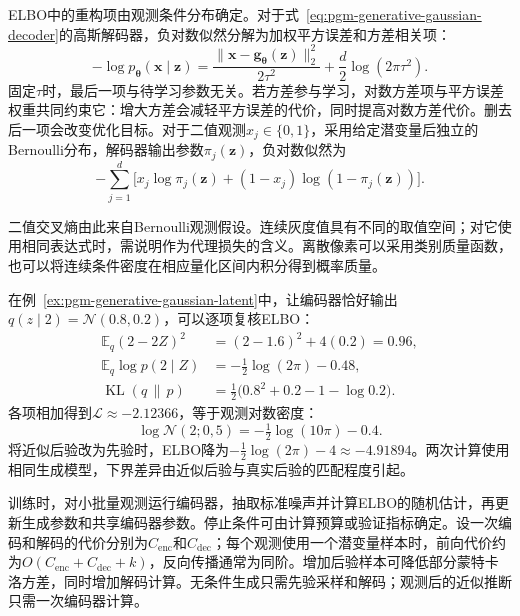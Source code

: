 ELBO中的重构项由观测条件分布确定。对于式~\eqref{eq:pgm-generative-gaussian-decoder}的高斯解码器，负对数似然分解为加权平方误差和方差相关项：
\begin{equation}
  \label{eq:pgm-generative-reconstruction}
  -\log p_{\bm{\theta}}(\bm{x}\mid\bm{z})
  =\frac{\lVert\bm{x}-\bm{g}_{\bm{\theta}}(\bm{z})\rVert_2^2}
          {2\tau^2}
    +\frac{d}{2}\log(2\pi\tau^2).
\end{equation}
固定$\tau$时，最后一项与待学习参数无关。若方差参与学习，对数方差项与平方误差权重共同约束它：增大方差会减轻平方误差的代价，同时提高对数方差代价。删去后一项会改变优化目标。对于二值观测$x_j\in\{0,1\}$，采用给定潜变量后独立的Bernoulli分布，解码器输出参数$\pi_j(\bm{z})$，负对数似然为
\[
  -\sum_{j=1}^{d}
    \bigl[x_j\log\pi_j(\bm{z})
      +(1-x_j)\log(1-\pi_j(\bm{z}))\bigr].
\]

二值交叉熵由此来自Bernoulli观测假设。连续灰度值具有不同的取值空间；对它使用相同表达式时，需说明作为代理损失的含义。离散像素可以采用类别质量函数，也可以将连续条件密度在相应量化区间内积分得到概率质量。

在例~\ref{ex:pgm-generative-gaussian-latent}中，让编码器恰好输出$q(z\mid2)=\mathcal{N}(0.8,0.2)$，可以逐项复核ELBO：
\[
  \begin{aligned}
    \mathbb{E}_{q}(2-2Z)^2&=(2-1.6)^2+4(0.2)=0.96,\\
    \mathbb{E}_{q}\log p(2\mid Z)&=-\tfrac12\log(2\pi)-0.48,\\
    \operatorname{KL}(q\,\|\,p)&=
       \tfrac12\bigl(0.8^2+0.2-1-\log0.2\bigr).
  \end{aligned}
\]
各项相加得到$\mathcal{L}\approx-2.12366$，等于观测对数密度：
\[
  \log\mathcal{N}(2;0,5)
  =-\tfrac12\log(10\pi)-0.4.
\]
将近似后验改为先验时，ELBO降为$-\tfrac12\log(2\pi)-4\approx-4.91894$。两次计算使用相同生成模型，下界差异由近似后验与真实后验的匹配程度引起。

训练时，对小批量观测运行编码器，抽取标准噪声并计算ELBO的随机估计，再更新生成参数和共享编码器参数。停止条件可由计算预算或验证指标确定。设一次编码和解码的代价分别为$C_{\mathrm{enc}}$和$C_{\mathrm{dec}}$；每个观测使用一个潜变量样本时，前向代价约为$O(C_{\mathrm{enc}}+C_{\mathrm{dec}}+k)$，反向传播通常为同阶。增加后验样本可降低部分蒙特卡洛方差，同时增加解码计算。无条件生成只需先验采样和解码；观测后的近似推断只需一次编码器计算。

